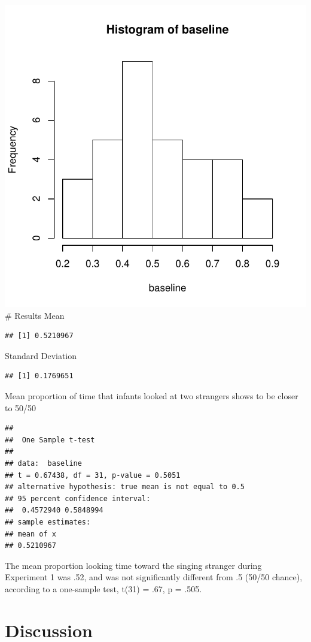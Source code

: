 \documentclass[man]{apa6}
\begin{document}
\includegraphics{Midterm_files/figure-latex/myfig-1.pdf} \# Results Mean

\begin{verbatim}
## [1] 0.5210967
\end{verbatim}

Standard Deviation

\begin{verbatim}
## [1] 0.1769651
\end{verbatim}

Mean proportion of time that infants looked at two strangers shows to be
closer to 50/50

\begin{verbatim}
## 
##  One Sample t-test
## 
## data:  baseline
## t = 0.67438, df = 31, p-value = 0.5051
## alternative hypothesis: true mean is not equal to 0.5
## 95 percent confidence interval:
##  0.4572940 0.5848994
## sample estimates:
## mean of x 
## 0.5210967
\end{verbatim}

The mean proportion looking time toward the singing stranger during
Experiment 1 was .52, and was not significantly different from .5 (50/50
chance), according to a one-sample test, t(31) = .67, p = .505.

\section{Discussion}\label{discussion}
\end{document}
